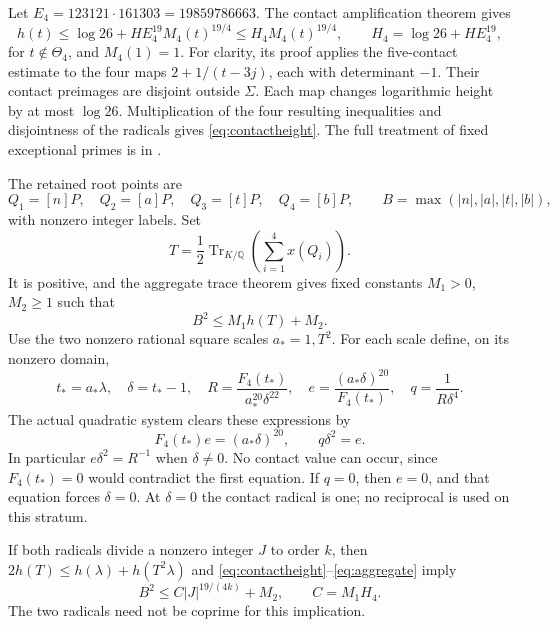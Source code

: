 \documentclass[11pt,a4paper]{article}
\newcommand{\Q}{\mathbb Q}\newcommand{\Z}{\mathbb Z}\newcommand{\HH}{\mathcal H}
\DeclareMathOperator{\Tr}{Tr}\DeclareMathOperator{\Nm}{Nm}
\begin{document}
Let $E_4=123121\cdot161303=19859786663$. The contact amplification
 theorem gives
\begin{equation}\label{eq:contactheight}
 h(t)\le\log26+HE_4^{19}M_4(t)^{19/4}
       \le H_4M_4(t)^{19/4},\qquad
 H_4=\log26+HE_4^{19},
\end{equation}
for $t\notin\Theta_4$, and $M_4(1)=1$.
For clarity, its proof applies the five-contact estimate to the four
maps $2+1/(t-3j)$, each with determinant $-1$. Their contact preimages
are disjoint outside $\Sigma$. Each map changes logarithmic height
by at most $\log26$. Multiplication of the four resulting inequalities
and disjointness of the radicals gives \eqref{eq:contactheight}.
The full treatment of fixed exceptional primes is in \cite{Contacts}.

The retained root points are
\[
 Q_1=[n]P,\quad Q_2=[a]P,\quad Q_3=[t]P,\quad Q_4=[b]P,
 \qquad B=\max(|n|,|a|,|t|,|b|),
\]
with nonzero integer labels. Set
\[
 T=\frac12\Tr_{K/\Q}\left(\sum_{i=1}^4x(Q_i)\right).
\]
It is positive, and the aggregate trace theorem gives fixed constants
$M_1>0$, $M_2\ge1$ such that
\begin{equation}\label{eq:aggregate}
                         B^2\le M_1h(T)+M_2.
\end{equation}
Use the two nonzero rational square scales $a_*=1,T^2$.
For each scale define, on its nonzero domain,
\begin{equation}\label{eq:detector}
 t_*=a_*\lambda,\quad \delta=t_*-1,\quad
 R=\frac{F_4(t_*)}{a_*^{20}\delta^{22}},\quad
 e=\frac{(a_*\delta)^{20}}{F_4(t_*)},\quad
 q=\frac1{R\delta^4}.
\end{equation}
The actual quadratic system clears these expressions by
\begin{equation}\label{eq:clearing}
             F_4(t_*)e=(a_*\delta)^{20},\qquad q\delta^2=e.
\end{equation}
In particular $e\delta^2=R^{-1}$ when $\delta\ne0$.
No contact value can occur, since $F_4(t_*)=0$ would contradict the
first equation. If $q=0$, then $e=0$, and that equation forces
$\delta=0$. At $\delta=0$ the contact radical is one; no reciprocal
is used on this stratum.

If both radicals divide a nonzero integer $J$ to order $k$, then
$2h(T)\le h(\lambda)+h(T^2\lambda)$ and
\eqref{eq:contactheight}--\eqref{eq:aggregate} imply
\begin{equation}\label{eq:heighttransfer}
 B^2\le C|J|^{19/(4k)}+M_2,\qquad C=M_1H_4.
\end{equation}
The two radicals need not be coprime for this implication.
\end{document}
